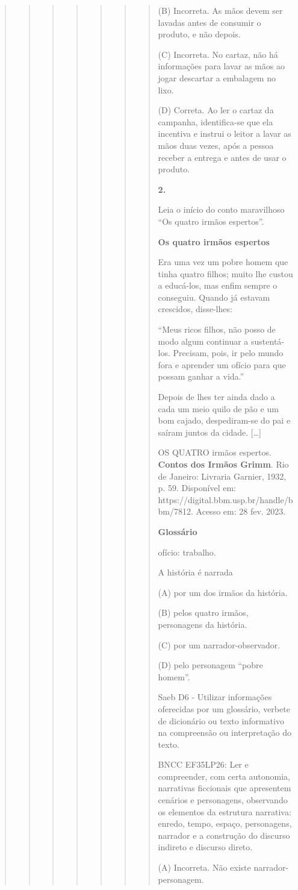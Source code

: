 \begin{quote}
\begin{quote}
\begin{quote}
\begin{quote}
\begin{quote}
\begin{quote}
\begin{quote}
(B) Incorreta. As mãos devem ser lavadas antes de consumir o produto, e
não depois.

(C) Incorreta. No cartaz, não há informações para lavar as mãos ao jogar
descartar a embalagem no lixo.

(D) Correta. Ao ler o cartaz da campanha, identifica-se que ela
incentiva e instrui o leitor a lavar as mãos duas vezes, após a pessoa
receber a entrega e antes de usar o produto.

\textbf{2.}

Leia o início do conto maravilhoso ``Os quatro irmãos espertos''.

\textbf{Os quatro irmãos espertos}

Era uma vez um pobre homem que tinha quatro filhos; muito lhe custou a
educá-los, mas enfim sempre o conseguiu. Quando já estavam crescidos,
disse-lhes:

``Meus ricos filhos, não posso de modo algum continuar a sustentá-los.
Precisam, pois, ir pelo mundo fora e aprender um ofício para que possam
ganhar a vida.''

Depois de lhes ter ainda dado a cada um meio quilo de pão e um bom
cajado, despediram-se do pai e saíram juntos da cidade. {[}\ldots{}{]}

OS QUATRO irmãos espertos. \textbf{Contos dos Irmãos Grimm}. Rio de
Janeiro: Livraria Garnier, 1932, p. 59. Disponível em:
https://digital.bbm.usp.br/handle/bbm/7812. Acesso em: 28 fev. 2023.

\textbf{Glossário}

ofício: trabalho.

A história é narrada

(A) por um dos irmãos da história.

(B) pelos quatro irmãos, personagens da história.

(C) por um narrador-observador.

(D) pelo personagem ``pobre homem''.

Saeb D6 - Utilizar informações oferecidas por um glossário, verbete de
dicionário ou texto informativo na compreensão ou interpretação do
texto.

BNCC EF35LP26: Ler e compreender, com certa autonomia, narrativas
ficcionais que apresentem cenários e personagens, observando os
elementos da estrutura narrativa: enredo, tempo, espaço, personagens,
narrador e a construção do discurso indireto e discurso direto.

(A) Incorreta. Não existe narrador-personagem.


\end{quote}
\end{quote}
\end{quote}
\end{quote}
\end{quote}
\end{quote}
\end{quote}
